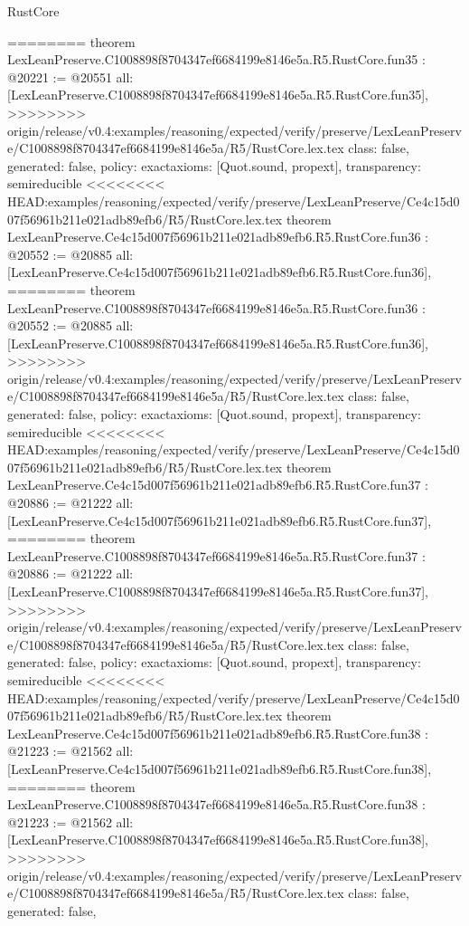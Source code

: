 \begin{lexlean}{RustCore}
\begin{coremodule}
{\begin{coremodule}
{{{{{{{{{{{{{{{{{{{{{{{{{{{{{{{{{{{{{{========
theorem LexLeanPreserve.C1008898f8704347ef6684199e8146e5a.R5.RustCore.fun35 : @20221 := @20551 {
  all: [LexLeanPreserve.C1008898f8704347ef6684199e8146e5a.R5.RustCore.fun35],
>>>>>>>> origin/release/v0.4:examples/reasoning/expected/verify/preserve/LexLeanPreserve/C1008898f8704347ef6684199e8146e5a/R5/RustCore.lex.tex
  class: false,
  generated: false,
  policy: exact{axioms: [Quot.sound, propext]},
  transparency: semireducible
}
<<<<<<<< HEAD:examples/reasoning/expected/verify/preserve/LexLeanPreserve/Ce4c15d007f56961b211e021adb89efb6/R5/RustCore.lex.tex
theorem LexLeanPreserve.Ce4c15d007f56961b211e021adb89efb6.R5.RustCore.fun36 : @20552 := @20885 {
  all: [LexLeanPreserve.Ce4c15d007f56961b211e021adb89efb6.R5.RustCore.fun36],
========
theorem LexLeanPreserve.C1008898f8704347ef6684199e8146e5a.R5.RustCore.fun36 : @20552 := @20885 {
  all: [LexLeanPreserve.C1008898f8704347ef6684199e8146e5a.R5.RustCore.fun36],
>>>>>>>> origin/release/v0.4:examples/reasoning/expected/verify/preserve/LexLeanPreserve/C1008898f8704347ef6684199e8146e5a/R5/RustCore.lex.tex
  class: false,
  generated: false,
  policy: exact{axioms: [Quot.sound, propext]},
  transparency: semireducible
}
<<<<<<<< HEAD:examples/reasoning/expected/verify/preserve/LexLeanPreserve/Ce4c15d007f56961b211e021adb89efb6/R5/RustCore.lex.tex
theorem LexLeanPreserve.Ce4c15d007f56961b211e021adb89efb6.R5.RustCore.fun37 : @20886 := @21222 {
  all: [LexLeanPreserve.Ce4c15d007f56961b211e021adb89efb6.R5.RustCore.fun37],
========
theorem LexLeanPreserve.C1008898f8704347ef6684199e8146e5a.R5.RustCore.fun37 : @20886 := @21222 {
  all: [LexLeanPreserve.C1008898f8704347ef6684199e8146e5a.R5.RustCore.fun37],
>>>>>>>> origin/release/v0.4:examples/reasoning/expected/verify/preserve/LexLeanPreserve/C1008898f8704347ef6684199e8146e5a/R5/RustCore.lex.tex
  class: false,
  generated: false,
  policy: exact{axioms: [Quot.sound, propext]},
  transparency: semireducible
}
<<<<<<<< HEAD:examples/reasoning/expected/verify/preserve/LexLeanPreserve/Ce4c15d007f56961b211e021adb89efb6/R5/RustCore.lex.tex
theorem LexLeanPreserve.Ce4c15d007f56961b211e021adb89efb6.R5.RustCore.fun38 : @21223 := @21562 {
  all: [LexLeanPreserve.Ce4c15d007f56961b211e021adb89efb6.R5.RustCore.fun38],
========
theorem LexLeanPreserve.C1008898f8704347ef6684199e8146e5a.R5.RustCore.fun38 : @21223 := @21562 {
  all: [LexLeanPreserve.C1008898f8704347ef6684199e8146e5a.R5.RustCore.fun38],
>>>>>>>> origin/release/v0.4:examples/reasoning/expected/verify/preserve/LexLeanPreserve/C1008898f8704347ef6684199e8146e5a/R5/RustCore.lex.tex
  class: false,
  generated: false,
}}}}}}}}}}}}}}}}}}}}}}}}}}}}}}}}}}}}}}}}}}
\end{coremodule}}
\end{coremodule}
\end{lexlean}
